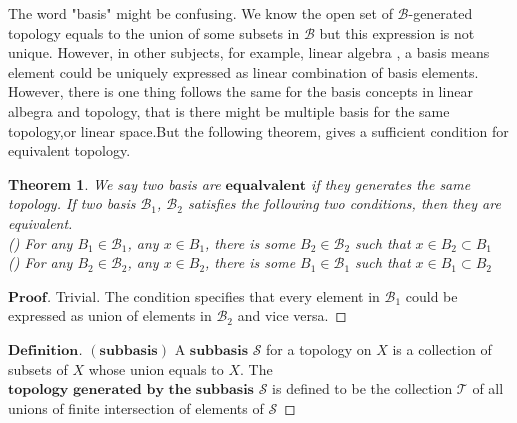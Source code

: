 \documentclass[a4paper, 11pt]{article}
\newtheorem{theorem}{Theorem}
\theoremstyle{remark}
\newenvironment{myprf}
{\renewcommand\qedsymbol{$ $}\begin{proof}[$\mathbf{Proof}$]}
  {\end{proof}}
\newenvironment{mydef}
{\renewcommand\qedsymbol{$ $}\begin{proof}[$\mathbf{Definition}$]}
  {\end{proof}}
\theoremstyle{definition}
\begin{document}
\indent The word "basis" might be confusing. We know the open set of $\mathcal{B}$-generated topology equals to the union of some subsets in $\mathcal{B}$ but this
expression is not unique. However, in other subjects, for example, linear algebra
,  a basis means element could be uniquely expressed as linear combination of basis elements.\\
\indent
However, there is one thing follows the same for the basis concepts in linear 
albegra and topology, that is there might be multiple basis for the same topology,or linear space.But the following theorem, gives a sufficient condition for 
equivalent topology.
\vspace{0.5cm}
\begin{theorem}
        We say two basis are $\textbf{equalvalent}$ if they generates the same
        topology. If two basis $\mathcal{B}_1$, $\mathcal{B}_2$ satisfies the 
        following two conditions, then they are equivalent.\\
        () For any $B_1\in \mathcal{B}_1$, any $x\in B_1$, there
        is some $B_2\in \mathcal{B}_2$ such that $x\in B_2\subset B_1$\\
        () For any $B_2\in \mathcal{B}_2$, any $x\in B_2$, there
        is some $B_1\in \mathcal{B}_1$ such that $x\in B_1\subset B_2$\\
\end{theorem}
\begin{myprf}
        Trivial. The condition specifies that every element in $\mathcal{B}_1$ 
        could be expressed as union of elements in $\mathcal{B}_2$ and vice versa.
\end{myprf}
\vspace{0.5cm}
\begin{mydef}$(\textbf{subbasis})$ A $\textbf{subbasis}$ $\mathcal{S}$
        for a topology on $X$
        is a collection of subsets of $X$ whose union equals to $X$. The
        $\textbf{topology generated by the subbasis}$ $\mathcal{S}$ is defined
        to be the collection $\mathcal{T}$ of all unions of finite intersection
        of elements of $\mathcal{S}$
        
\end{mydef}
\end{document}
